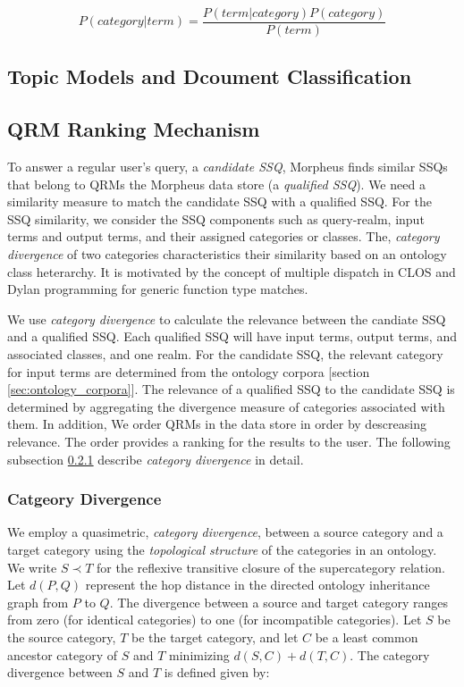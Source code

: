 \begin{equation}
\label{eq:bayesrule}
P (category | term) = \frac{P(term | category) P(category)}{P(term)}
\end{equation}    

\subsection{Topic Models and Dcoument Classification }
\label{sec:topicmodels}





\subsection{QRM Ranking Mechanism} 
\label{sec:qrm_ranking}

To answer a regular user's query, a \textit{candidate
SSQ}, Morpheus finds similar SSQs that belong to QRMs the Morpheus data store (a
\textit{qualified SSQ}). We need a similarity measure to match the candidate SSQ
with a qualified SSQ. For the SSQ similarity, we
consider the SSQ components such as query-realm, input
terms and output terms, and their assigned categories or classes. The,
\textit{category divergence} of two categories characteristics their 
similarity based on an ontology class heterarchy. 
It is motivated by the concept of multiple
dispatch in CLOS \cite{Steele1990} and Dylan programming \cite{Barrett1996} for
generic function type matches. 

We use \emph{category divergence} to calculate the relevance between the candiate SSQ
and a qualified SSQ. Each qualified SSQ will
have input terms, output terms, and associated classes, and one realm. For the
candidate SSQ, the relevant category for input terms are determined from the
ontology corpora [section \ref{sec:ontology_corpora}]. The relevance 
of a qualified SSQ to the candidate SSQ is determined by
aggregating the divergence measure of categories associated with them. In addition, 
We order QRMs in the data store in order by descreasing relevance. 
The order provides a ranking for the results to the user. 
The following subsection \ref{sec:ctd} describe \emph{category divergence} in detail.

\subsubsection{Catgeory Divergence}
\label{sec:ctd}

We employ a quasimetric, \textit{category
divergence},
between a source category and a target category using the \textit{topological
structure} of the categories in an ontology. We write $S \prec T$ for the
reflexive
transitive closure of the supercategory relation. Let $d(P,Q)$ represent the hop
distance in the directed ontology inheritance graph from $P$ to $Q$. The
divergence between a source and target category ranges from zero (for identical
categories) to one (for incompatible categories). Let $S$ be the source
category, $T$ be
the target category, and let $C$ be a least common ancestor category of $S$ and
$T$
minimizing $d(S,C) + d(T,C)$. The category divergence between $S$ and $T$ is
defined given by:

